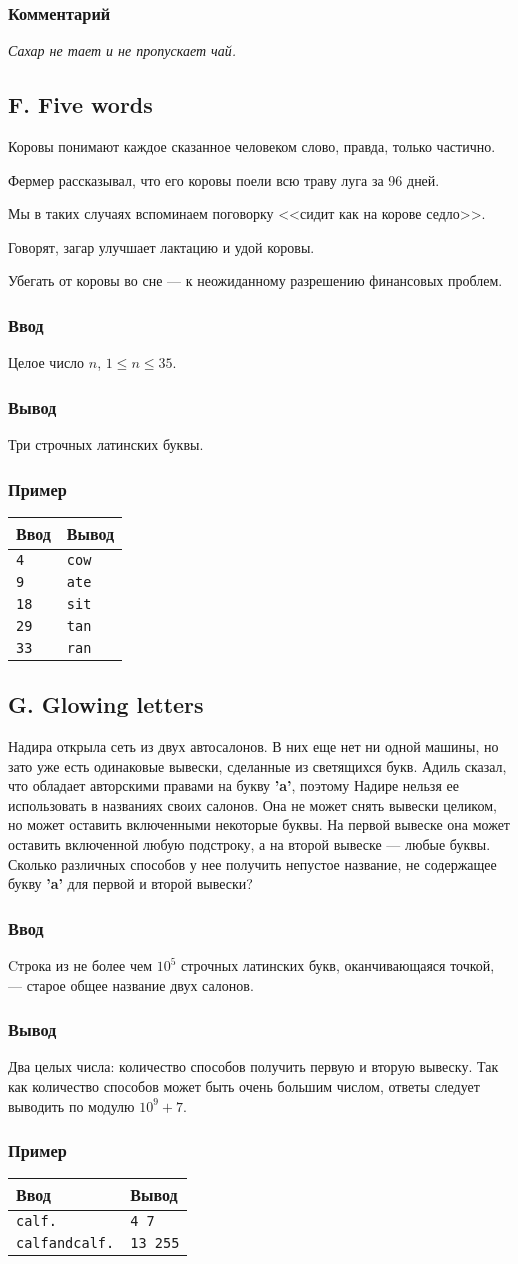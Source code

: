 \documentclass[10pt, a4paper]{article}
\newcommand{\informat}[1]
{
	\subsubsection*{Ввод} #1
}
\newcommand{\outformat}[1]
{
	\subsubsection*{Вывод} #1
}
\newcommand{\examplee}[4]
{
	\subsubsection*{Пример}
	\noindent
	\begin{center}
	\begin{tabularx}{\linewidth}{|X|X|}
	\hline
	Ввод 	& Вывод  	\\
	\hline
	{\tt #1} & {\tt #2}	\\
	\hline
	{\tt #3} & {\tt #4}	\\
	\hline
	\end{tabularx}
	\end{center}
}
\newcommand{\exampleeeee}[5]
{
	\subsubsection*{Пример}
	\begin{center}
	\begin{tabularx}{\linewidth}{|X|X|}
	\hline
	Ввод 	& Вывод  	\\
	\hline
	#1		\\
	\hline
	#2		\\
	\hline
	#3		\\
	\hline
	#4		\\
	\hline
	#5		\\
	\hline
	\end{tabularx}
	\end{center}
}
\newcommand{\excomm}[1]
{
	\subsubsection*{Комментарий}
	\textit{#1}
}
\begin{document}
\excomm{Сахар не тает и не пропускает чай.}



\subsection*{F. Five words}

\noindent
Коровы понимают каждое сказанное человеком слово, правда, только частично.

\noindent
Фермер рассказывал, что его коровы поели всю траву луга за 96 дней.

\noindent
Мы в таких случаях вспоминаем поговорку <<сидит как на корове седло>>.

\noindent
Говорят, загар улучшает лактацию и удой коровы.

\noindent
Убегать от коровы во сне --- к неожиданному разрешению финансовых проблем.

\informat{Целое число $n$, $1 \le n \le 35$.}

\outformat{Три строчных латинских буквы.}

\exampleeeee{{\tt 4} & {\tt cow}}{{\tt 9} & {\tt ate}}{{\tt 18} & {\tt sit}}{{\tt 29} & {\tt tan}}{{\tt 33} & {\tt ran}}



\subsection*{G. Glowing letters}

Надира открыла сеть из двух автосалонов. В них еще нет ни одной машины, но зато уже есть одинаковые вывески, сделанные из светящихся букв. Адиль сказал, что обладает авторскими правами на букву \textbf{'a'}, поэтому Надире нельзя ее использовать в названиях своих салонов. Она не может снять вывески целиком, но может оставить включенными некоторые буквы. На первой вывеске она может оставить включенной любую подстроку, а на второй вывеске --- любые буквы. Сколько различных способов у нее получить непустое название, не содержащее букву \textbf{'a'} для первой и второй вывески?

\informat{Cтрока из не более чем $10^5$ строчных латинских букв, оканчивающаяся точкой, --- старое общее название двух салонов.}

\outformat{Два целых числа: количество способов получить первую и вторую вывеску. Так как количество способов может быть очень большим числом, ответы следует выводить по модулю $10^9 + 7$.}

\examplee{calf.}{4 7}{calfandcalf.}{13 255}
\end{document}
